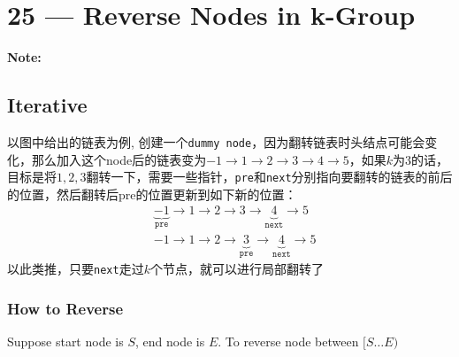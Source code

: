 \documentclass[a4paper,12pt]{article}
\begin{document}
\section{25 --- Reverse Nodes in k-Group} \label{025LC}
\textbf{\large{Note:}}
\subsection{Iterative}
\begin{CJK*}{UTF8}{gbsn}
以图中给出的链表为例,
创建一个\texttt{dummy node}，因为翻转链表时头结点可能会变化，那么加入这个node后的链表变为$-1\to1\to2\to3\to4\to5$，如果$k$为3的话，目标是将$1,2,3$翻转一下，需要一些指针，\texttt{pre}和\texttt{next}分别指向要翻转的链表的前后的位置，然后翻转后pre的位置更新到如下新的位置：
\begin{align}
&\underbrace{-1}_{\mathtt{pre}}\to1\to2\to3\to\underbrace{4}_{\mathtt{next}}\to5 \\ 
&-1\to1\to2\to\underbrace{3}_{\mathtt{pre}}\to\underbrace{4}_{\mathtt{next}}\to5 
\end{align}
以此类推，只要\texttt{next}走过$k$个节点，就可以进行局部翻转了
\clearpage
\end{CJK*}
\subsubsection{How to Reverse}
Suppose start node is $S$, end node is $E$. To reverse node between $[S\ldots E)$
\par
\end{document}
